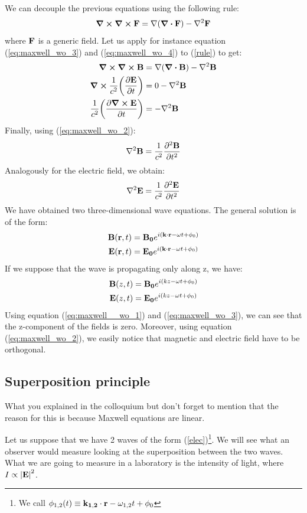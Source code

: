 \documentclass[11pt,a4paper]{article}
\begin{document}
We can decouple the previous equations using the following rule:
\begin{equation}
\curl \curl \vb{F}=\nabla (\div \vb{F})- \nabla^2\vb{F}\label{rule}
\end{equation}
where $\vb{F}$ is a generic field. Let us apply for instance equation (\ref{eq:maxwell_wo_3}) and (\ref{eq:maxwell_wo_4}) to (\ref{rule}) to get:
\begin{align*}
\curl \curl \vb{B} &=\nabla (\div \vb{B})- \nabla^2\vb{B} \\
\curl \frac{1}{c^2}\qty(\pdv{\vb{E}}{t}) &=0-\nabla^2\vb{B} \\
\frac{1}{c^2}\qty(\pdv{\curl \vb{E}}{t}) &=-\nabla^2\vb{B}
\end{align*}
Finally, using (\ref{eq:maxwell_wo_2}):
\begin{equation}
\nabla^2\vb{B}=\frac{1}{c^2}\pdv{^2 \vb{B}}{t^2}
\end{equation}
Analogously for the electric field, we obtain:
\begin{equation}
\nabla^2\vb{E}=\frac{1}{c^2}\pdv{^2 \vb{E}}{t^2}
\end{equation}
We have obtained two three-dimensional wave equations. The general solution is of the form:
\begin{align}
\vb{B}(\vb{r},t) &=\vb{B_0}e^{i(\vb{k} \cdot \vb{r}-\omega t+\phi_0)}\\
\vb{E}(\vb{r},t) &=\vb{E_0}e^{i(\vb{k} \cdot \vb{r}-\omega t+\phi_0)}\label{elec}
\end{align}
If we suppose that the wave is propagating only along z, we have:
\begin{align}
\vb{B}(z,t) &=\vb{B_0}e^{i(kz-\omega t+\phi_0)}\\
\vb{E}(z,t) &=\vb{E_0}e^{i(kz-\omega t+\phi_0)}
\end{align}
Using equation (\ref{eq:maxwell__wo_1}) and (\ref{eq:maxwell_wo_3}), we can see that the z-component of the fields is zero. Moreover, using equation (\ref{eq:maxwell_wo_2}), we easily notice that magnetic and electric field have to be orthogonal.

\subsection{Superposition principle}

What you explained in the colloquium but don't forget to mention that the reason for this is because Maxwell equations are linear.

Let us suppose that we have 2 waves of the form (\ref{elec})\footnote{We call $\phi_{1,2}(t)\equiv\vb{k_{1,2}} \cdot \vb{r}-\omega_{1,2} t+\phi_0$}. We will see what an observer would measure looking at the superposition between the two waves. What we are going to measure in a laboratory is the intensity of light, where $I\propto \abs{\vb{E}}^2$.
\end{document}
